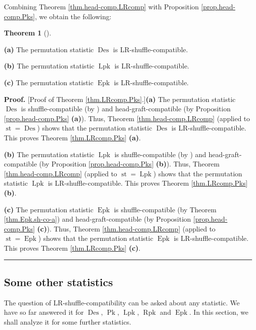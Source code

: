 \documentclass[numbers=enddot,12pt,final,onecolumn,notitlepage]{scrartcl}%
\theoremstyle{definition}
\newtheorem{theo}{Theorem}[section]
\newenvironment{theorem}[1][]
{\begin{theo}[#1]\begin{leftbar}}
{\end{leftbar}\end{theo}}
\newenvironment{proof}[1][Proof]{\noindent\textbf{#1.} }{\ \rule{0.5em}{0.5em}}
\begin{document}
Combining Theorem \ref{thm.head-comp.LRcomp} with Proposition
\ref{prop.head-comp.Pks}, we obtain the following:

\begin{theorem}
\label{thm.LRcomp.Pks}\textbf{(a)} The permutation statistic
$\operatorname*{Des}$ is LR-shuffle-compatible.

\textbf{(b)} The permutation statistic $\operatorname*{Lpk}$ is LR-shuffle-compatible.

\textbf{(c)} The permutation statistic $\operatorname*{Epk}$ is LR-shuffle-compatible.
\end{theorem}

\begin{proof}
[Proof of Theorem \ref{thm.LRcomp.Pks}.]\textbf{(a)} The permutation statistic
$\operatorname*{Des}$ is shuffle-compatible (by \cite[\S 2.4]{part1}) and
head-graft-compatible (by Proposition \ref{prop.head-comp.Pks} \textbf{(a)}).
Thus, Theorem \ref{thm.head-comp.LRcomp} (applied to $\operatorname*{st}%
=\operatorname*{Des}$) shows that the permutation statistic
$\operatorname*{Des}$ is LR-shuffle-compatible. This proves Theorem
\ref{thm.LRcomp.Pks} \textbf{(a)}.

\textbf{(b)} The permutation statistic $\operatorname*{Lpk}$ is
shuffle-compatible (by \cite[Theorem 4.9 \textbf{(a)}]{part1}) and
head-graft-compatible (by Proposition \ref{prop.head-comp.Pks} \textbf{(b)}).
Thus, Theorem \ref{thm.head-comp.LRcomp} (applied to $\operatorname*{st}%
=\operatorname*{Lpk}$) shows that the permutation statistic
$\operatorname*{Lpk}$ is LR-shuffle-compatible. This proves Theorem
\ref{thm.LRcomp.Pks} \textbf{(b)}.

\textbf{(c)} The permutation statistic $\operatorname*{Epk}$ is
shuffle-compatible (by Theorem \ref{thm.Epk.sh-co-a}) and
head-graft-compatible (by Proposition \ref{prop.head-comp.Pks} \textbf{(c)}).
Thus, Theorem \ref{thm.head-comp.LRcomp} (applied to $\operatorname*{st}%
=\operatorname*{Epk}$) shows that the permutation statistic
$\operatorname*{Epk}$ is LR-shuffle-compatible. This proves Theorem
\ref{thm.LRcomp.Pks} \textbf{(c)}.
\end{proof}

\subsection{\label{subsect.LR.others}Some other statistics}

The question of LR-shuffle-compatibility can be asked about any statistic. We
have so far answered it for $\operatorname*{Des}$, $\operatorname*{Pk}$,
$\operatorname*{Lpk}$, $\operatorname*{Rpk}$ and $\operatorname*{Epk}$. In
this section, we shall analyze it for some further statistics.
\end{document}
